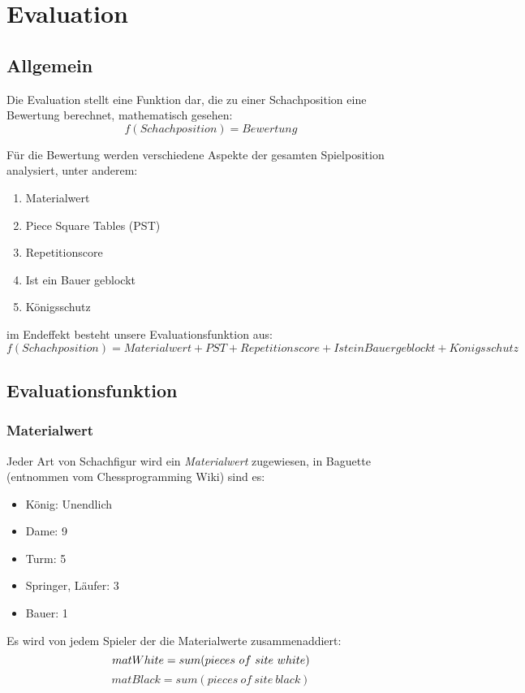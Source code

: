 \section{Evaluation}\label{eval}
\subsection{Allgemein}
Die Evaluation stellt eine Funktion dar, die zu einer Schachposition eine Bewertung berechnet, mathematisch gesehen: 
$$
f(Schachposition) = Bewertung
$$

Für die Bewertung werden verschiedene Aspekte der gesamten Spielposition analysiert, unter anderem: 
\begin{enumerate}
    \item{Materialwert}
    \item{Piece Square Tables (PST)}
    \item{Repetitionscore}
    \item{Ist ein Bauer geblockt}
    \item{K\"onigsschutz}
\end{enumerate}

im Endeffekt besteht unsere Evaluationsfunktion aus:
$$
f(Schachposition) = Materialwert + PST + Repetitionscore + Ist ein Bauer geblockt + K\ddot{o}nigsschutz
$$

\subsection{Evaluationsfunktion}

\subsubsection{Materialwert}
Jeder Art von Schachfigur wird ein \textit{Materialwert} zugewiesen, in Baguette (entnommen vom Chessprogramming Wiki) sind es:
\begin{itemize}
    \item{König: Unendlich} 
    \item{Dame: 9}
    \item{Turm: 5}
    \item{Springer, Läufer: 3}
    \item{Bauer: 1}
\end{itemize}

Es wird von jedem Spieler der die Materialwerte zusammenaddiert:
$$
matWhite = sum(pieces\ of\ site\ white) \\
$$
$$
matBlack = sum(pieces\ of\ site\ black)
$$

